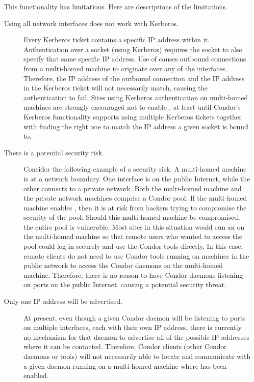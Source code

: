 This functionality has limitations.
Here are descriptions of the limitations.

\begin{description}

\item[Using all network interfaces does not work with Kerberos.] 
  Every Kerberos ticket contains a specific IP address within it.
  Authentication over a socket (using Kerberos) requires
  the socket to also specify that same specific IP address.
  Use of  causes outbound
  connections from a multi-homed machine to 
  originate over any of the interfaces.
  Therefore, the IP address of the outbound connection and the IP
  address in the Kerberos ticket will not necessarily match,
  causing the authentication to fail.
  Sites using Kerberos authentication on multi-homed machines are
  strongly encouraged not to enable ,
  at least until Condor's Kerberos functionality
  supports using multiple Kerberos tickets together with finding the right one
  to match the IP address a given socket is bound to. 

\item[There is a potential security risk.]
  Consider the following example of a security risk.
  A multi-homed machine is at a network boundary.
  One interface is on the public Internet, while the other connects to
  a private network.
  Both the multi-homed machine and the private network machines
  comprise a Condor pool.
  If the multi-homed machine enables ,
  then it is at risk from hackers trying to compromise the security of the pool.
  Should this multi-homed machine be compromised,
  the entire pool is vulnerable.
  Most sites in this situation would run an  on the
  multi-homed machine so that remote users who wanted to access the
  pool could log in securely and use the Condor tools directly.
  In this case, remote clients do not need to use Condor tools running
  on machines in the public network to access the Condor daemons on
  the multi-homed machine.
  Therefore, there is no reason to have Condor daemons listening on
  ports on the public Internet, causing a potential security threat.

\item[Only one IP address will be advertised.]
  At present, even though a given Condor daemon will be listening to
  ports on multiple interfaces, each with their own IP address,
  there is currently no mechanism for that daemon to advertise all of
  the possible IP addresses where it can be contacted.
  Therefore, Condor clients (other Condor daemons or tools) will not
  necessarily able to locate and communicate with a given daemon
  running on a multi-homed machine where
   has been enabled.


\end{description}
